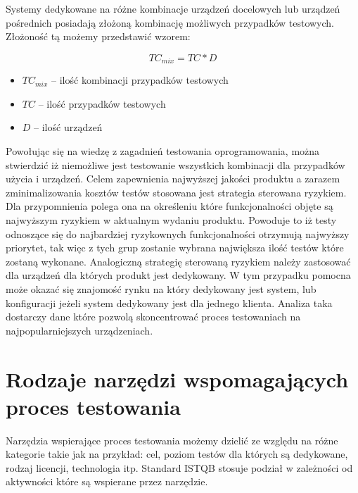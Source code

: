 Systemy dedykowane na różne kombinacje urządzeń docelowych lub urządzeń pośrednich posiadają złożoną kombinację możliwych przypadków testowych. Złożoność tą możemy przedstawić wzorem:

\begin{equation}
TC_{mix} = TC * D
\end{equation}
	\begin{itemize}
		\item $TC_{mix}$ -- ilość kombinacji przypadków testowych
		\item $TC$ -- ilość przypadków testowych
		\item $D$ -- ilość urządzeń
	\end{itemize}


Powołując się na wiedzę z zagadnień testowania oprogramowania, można stwierdzić iż niemożliwe jest testowanie wszystkich kombinacji dla przypadków użycia i urządzeń. Celem zapewnienia najwyższej jakości produktu a zarazem zminimalizowania kosztów testów stosowana jest strategia sterowana ryzykiem. Dla przypomnienia polega ona na określeniu które funkcjonalności objęte są najwyższym ryzykiem w aktualnym wydaniu produktu. Powoduje to iż testy odnoszące się do najbardziej ryzykownych funkcjonalności otrzymują najwyższy priorytet, tak więc z tych grup zostanie wybrana największa ilość testów które zostaną wykonane. Analogiczną strategię sterowaną ryzykiem należy zastosować dla urządzeń dla których produkt jest dedykowany. W tym przypadku pomocna może okazać się znajomość rynku na który dedykowany jest system, lub konfiguracji jeżeli system dedykowany jest dla jednego klienta. Analiza taka dostarczy dane które pozwolą skoncentrować proces testowaniach na najpopularniejszych urządzeniach. 

\section{Rodzaje narzędzi wspomagających proces testowania}
Narzędzia wspierające proces testowania możemy dzielić ze względu na różne kategorie takie jak na przykład: cel, poziom testów dla których są dedykowane, rodzaj licencji, technologia itp. Standard ISTQB stosuje podział w zależności od aktywności które są wspierane przez narzędzie. 

